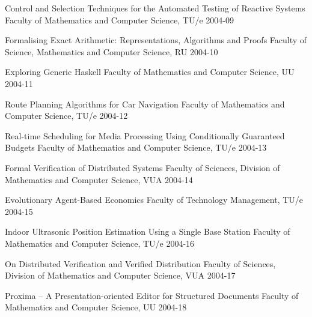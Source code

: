 \begin{multicols}{2}
	 {Control and Selection Techniques for the Automated Testing of Reactive Systems}
         {Faculty of Mathematics and Computer Science, TU/e}
         {2004-09}
  
         {Formalising Exact Arithmetic: Representations, Algorithms and Proofs}
         {Faculty of Science, Mathematics and Computer Science, RU}
         {2004-10}

	 {Exploring Generic Haskell}
	 {Faculty of Mathematics and Computer Science, UU}
	 {2004-11}

	 {Route Planning Algorithms for Car Navigation}
         {Faculty of Mathematics and Computer Science, TU/e}
         {2004-12}


 	 {Real-time Scheduling for Media Processing Using Conditionally Guaranteed                Budgets}
         {Faculty of Mathematics and Computer Science, TU/e}
         {2004-13}

	 {Formal Verification of Distributed Systems}
         {Faculty of Sciences, Division of Mathematics and Computer Science, VUA}
         {2004-14}

	 {Evolutionary Agent-Based Economics}
         {Faculty of Technology Management, TU/e}
         {2004-15}

	 {Indoor Ultrasonic Position Estimation Using a Single Base Station}
         {Faculty of Mathematics and Computer Science, TU/e}
         {2004-16}


	 {On Distributed Verification and Verified Distribution}
         {Faculty of Sciences, Division of Mathematics and Computer Science, VUA}
         {2004-17}


	 {Proxima -- A Presentation-oriented Editor for Structured Documents}
	 {Faculty of Mathematics and Computer Science, UU}
	 {2004-18}

\end{multicols}




